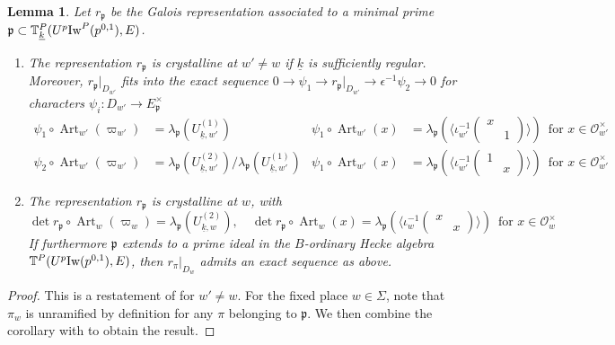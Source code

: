 \documentclass[leqno]{amsart}
\newcommand{\wt}[1]{\underline{ #1 }}
\newcommand{\TT}{\mathbb{T}} %
\newcommand{\Iw}{\textnormal{Iw}}
\DeclareMathOperator{\Art}{Art}
\newcommand{\oo}{\mathcal{O}} %
\newcommand{\fp}{\mathfrak{p}}
\newtheorem{lem}[thm]{Lemma}
\theoremstyle{definition}
\theoremstyle{remark}
\begin{document}
\begin{lem}\label{lem:galois_at_p}
	Let $r_{\fp}$ be the Galois representation
	associated to a minimal prime
	$\fp\subset \TT^P_{\wt{k}}(U^p\Iw^P(p^{0,1}),E)$.
	\begin{enumerate}[label=(\alph*)]
	\item The representation $r_\fp$ is crystalline at $w'\neq w$
	if $\wt{k}$ is sufficiently regular.
	Moreover, $r_\fp\vert_{D_{w'}}$ 
	fits into the exact sequence
	$0\to \psi_1\to r_{\fp}\vert_{D_{w'}} \to \epsilon^{-1}\psi_2\to 0$
	for characters $\psi_i\colon D_{w'}\to E_{\fp}^{\times}$
	\begin{equation}\label{eq:Gal_hecke_at_p}
	\begin{aligned}
		\psi_1\circ \Art_{w'}(\varpi_{w'})&=
		\lambda_{\fp}(U_{\wt{k},w'}^{(1)}) &
		\psi_1\circ \Art_{w'}(x)&=
		\lambda_{\fp}
		(\langle 
		\iota_{w'}^{-1}
		(\begin{smallmatrix}
			x&\\&1
		\end{smallmatrix})
		\rangle)\, \text{ for }x\in \oo_{w'}^{\times}\\
		\psi_2\circ \Art_{w'}(\varpi_{w'})&=
		\lambda_{\fp}(U_{\wt{k},w'}^{(2)})/
		\lambda_{\fp}(U_{\wt{k},w'}^{(1)}) &
		\psi_1\circ \Art_{w'}(x)&=
		\lambda_{\fp}
		(\langle 
		\iota_{w'}^{-1}
		(\begin{smallmatrix}
			1&\\&x
		\end{smallmatrix})
		\rangle)\, \text{ for }x\in \oo_{w'}^{\times}
	\end{aligned}
	\end{equation}
	\item The representation $r_\fp$ is 
	crystalline at $w$, with 
	\[
	\det r_\fp\circ \Art_w(\varpi_w)=
	\lambda_{\fp}(U_{\wt{k},w}^{(2)}),\quad
	\det r_\fp\circ \Art_w(x)=
	\lambda_{\fp}
	(\langle 
	\iota_{w}^{-1}
	(\begin{smallmatrix}
		x&\\&x
	\end{smallmatrix})
	\rangle)\, \text{ for }x\in \oo_{w}^{\times}
	\]
	If furthermore $\fp$ extends
	to a prime ideal in the $B$-ordinary Hecke algebra
	$\TT^P(U^p\Iw(p^{0,1}),E)$,
	then $r_\pi\vert_{D_w}$ 
	admits an exact sequence as above.
	\end{enumerate}
\end{lem}
\begin{proof}
This is a restatement of \cite[Cor 2.33]{ger}
for $w'\neq w$.
For the fixed place  $w\in \Sigma$,
note that $\pi_w$ is unramified 
by definition
for any $\pi$ belonging to $\fp$.
We then combine the corollary with \cite[Lem 2.31]{ger} to obtain 
the result.
\end{proof}
\end{document}
